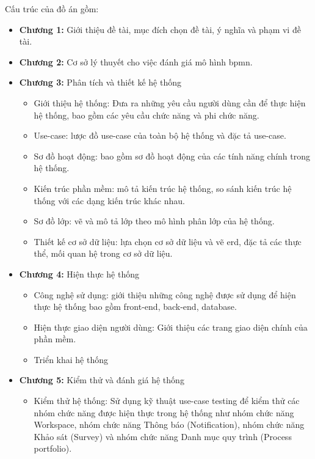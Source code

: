 Cấu trúc của đồ án gồm:
\begin{itemize}
      \item \textbf{Chương 1:} Giới thiệu đề tài, mục đích chọn đề tài, ý nghĩa và phạm vi đề tài.
      \item \textbf{Chương 2:} Cơ sở lý thuyết cho việc đánh giá mô hình \acrshort{bpmn}.
      \item \textbf{Chương 3:} Phân tích và thiết kế hệ thống
          \begin{itemize}
            \item Giới thiệu hệ thống: Đưa ra những yêu cầu người dùng cần để thực hiện hệ thống,
                  bao gồm các yêu cầu chức năng và phi chức năng.
            \item Use-case: lược đồ use-case của toàn bộ hệ thống và đặc tả use-case.
            \item Sơ đồ hoạt động: bao gồm sơ đồ hoạt động của các tính năng chính trong hệ
                  thống.
            \item Kiến trúc phần mềm: mô tả kiến trúc hệ thống, so sánh kiến trúc hệ thống với
                  các dạng kiến trúc khác nhau.
            \item Sơ đồ lớp: vẽ và mô tả lớp theo mô hình phân lớp của hệ thống.
            \item Thiết kế cơ sở dữ liệu: lựa chọn cơ sở dữ liệu và vẽ \acrfull*{erd}, đặc tả các thực thể,
                  mối quan hệ trong cơ sở dữ liệu.
          \end{itemize}
      \item \textbf{Chương 4:} Hiện thực hệ thống
          \begin{itemize}
            \item Công nghệ sử dụng: giới thiệu những công nghệ được sử dụng để hiện thực hệ
                  thống bao gồm front-end, back-end, database.
            \item Hiện thực giao diện người dùng: Giới thiệu các trang giao diện chính của phần
                  mềm.
            \item Triển khai hệ thống
          \end{itemize}
      \item \textbf{Chương 5:} Kiểm thử và đánh giá hệ thống
          \begin{itemize}
            \item Kiểm thử hệ thống: Sử dụng kỹ thuật use-case testing để kiểm thử các nhóm chức năng được hiện thực trong hệ thống như nhóm chức năng Workspace, nhóm chức năng Thông báo (Notification), nhóm chức năng Khảo sát (Survey) và nhóm chức năng Danh mục quy trình (Process portfolio).

\end{itemize}
\end{itemize}
